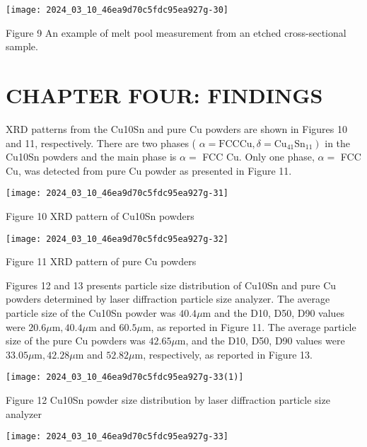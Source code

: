 \documentclass[10pt]{article}
\begin{document}
\begin{center}
\texttt{[image: 2024\_03\_10\_46ea9d70c5fdc95ea927g-30]}
\end{center}

Figure 9 An example of melt pool measurement from an etched cross-sectional sample.

\section*{CHAPTER FOUR: FINDINGS }
XRD patterns from the Cu10Sn and pure Cu powders are shown in Figures 10 and 11, respectively. There are two phases ( $\left.\alpha=\mathrm{FCC} \mathrm{Cu}, \delta=\mathrm{Cu}_{41} \mathrm{Sn}_{11}\right)$ in the Cu10Sn powders and the main phase is $\alpha=$ FCC Cu. Only one phase, $\alpha=$ FCC Cu, was detected from pure Cu powder as presented in Figure 11.

\begin{center}
\texttt{[image: 2024\_03\_10\_46ea9d70c5fdc95ea927g-31]}
\end{center}

Figure 10 XRD pattern of Cu10Sn powders

\begin{center}
\texttt{[image: 2024\_03\_10\_46ea9d70c5fdc95ea927g-32]}
\end{center}

Figure 11 XRD pattern of pure Cu powders

Figures 12 and 13 presents particle size distribution of Cu10Sn and pure Cu powders determined by laser diffraction particle size analyzer. The average particle size of the Cu10Sn powder was $40.4 \mu \mathrm{m}$ and the D10, D50, D90 values were $20.6 \mu \mathrm{m}, 40.4 \mu \mathrm{m}$ and $60.5 \mu \mathrm{m}$, as reported in Figure 11. The average particle size of the pure Cu powders was $42.65 \mu \mathrm{m}$, and the D10, D50, D90 values were $33.05 \mu \mathrm{m}, 42.28 \mu \mathrm{m}$ and $52.82 \mu \mathrm{m}$, respectively, as reported in Figure 13.

\begin{center}
\texttt{[image: 2024\_03\_10\_46ea9d70c5fdc95ea927g-33(1)]}
\end{center}

Figure 12 Cu10Sn powder size distribution by laser diffraction particle size analyzer

\begin{center}
\texttt{[image: 2024\_03\_10\_46ea9d70c5fdc95ea927g-33]}
\end{center}
\end{document}
